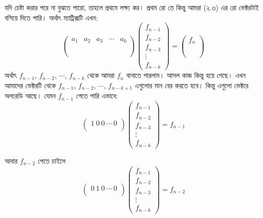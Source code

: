 \noindent যদি চেষ্টা করার পরে না বুঝতে পারো, তাহলে প্রথমে লক্ষ্য কর। প্রথম রো তে কিন্তু আমরা (২.৩) এর রো ভেক্টরটাই বসিয়ে দিতে পারি। অর্থাৎ ম্যাট্রিক্সটি এখন:
$$
\begin{pmatrix}
a_1 & a_2 & a_3 & \cdots & a_k \\
\ \\
\ \\
\ \\
\
\end{pmatrix}
\begin{pmatrix}
f_{n - 1} \\
f_{n - 2} \\
f_{n - 3} \\
\vdots \\
f_{n - k}
\end{pmatrix}
=
\begin{pmatrix}
f_{n} \\
\ \\
\ \\
\ \\
\
\end{pmatrix}
$$
\noindent অর্থাৎ $f_{n-1}$, $f_{n-2}$, $\cdots$, $f_{n-k}$ থেকে আমরা $f_n$ বানাতে পারলাম। আসল কাজ কিন্তু হয়ে গেছে। এখন আমাদের ভেক্টরটি থেকে $f_{n-1}$, $f_{n-2}$, $\cdots$, $f_{n-k+1}$ এগুলোর মান বের করতে হবে। কিন্তু এগুলো ভেক্টরে অলরেডি আছে। যেমন $f_{n-1}$ পেতে পারি এভাবে:
$$
\begin{pmatrix}
1 \ 0 \ 0 \ \cdots \ 0 \\
\end{pmatrix}
\begin{pmatrix}
f_{n - 1} \\
f_{n - 2} \\
f_{n - 3} \\
\vdots \\
f_{n - k}
\end{pmatrix}
= f_{n - 1}
$$

\noindent আবার $f_{n - 2}$ পেতে চাইলে
$$
\begin{pmatrix}
0 \ 1 \ 0 \ \cdots \ 0 \\
\end{pmatrix}
\begin{pmatrix}
f_{n - 1} \\
f_{n - 2} \\
f_{n - 3} \\
\vdots \\
f_{n - k}
\end{pmatrix}
= f_{n - 2}
$$

